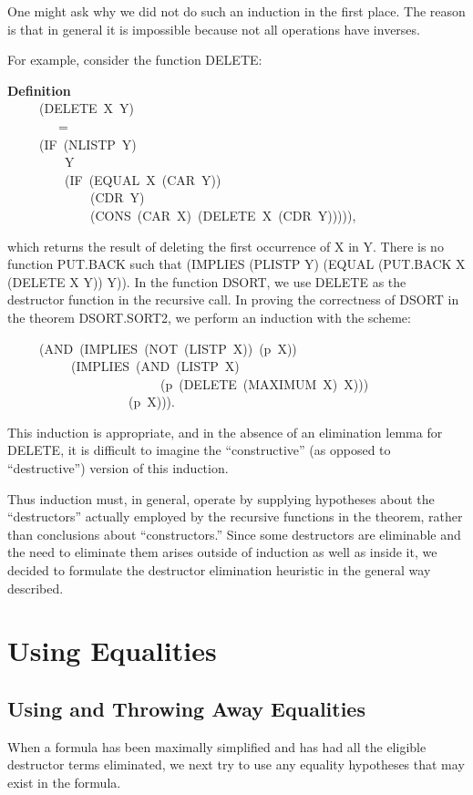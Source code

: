 \documentclass[10pt]{book}
\newenvironment{pubasis}{\begin{flushleft}}{\end{flushleft}}
\newcommand{\axiomordefinition}[1]{\vspace{6pt}\Large\textsf{\textbf{#1}}\normalsize}
\begin{document}
One might ask why we did not do such an induction in the first place.
The reason is that in general it is impossible because not all operations
have inverses.

For example, consider the function DELETE:
\begin{pubasis}
\axiomordefinition{Definition}\\
~~~~~(DELETE~X~Y)\\
~~~~~~~~=\\
~~~~~(IF~(NLISTP~Y)\\
~~~~~~~~~Y\\
~~~~~~~~~(IF~(EQUAL~X~(CAR~Y))\\
~~~~~~~~~~~~~(CDR~Y)\\
~~~~~~~~~~~~~(CONS~(CAR~X)~(DELETE~X~(CDR~Y))))),\\
\end{pubasis}
which returns the result of deleting the first occurrence
of X in Y.  There is no function PUT.BACK such that
(IMPLIES (PLISTP Y) (EQUAL (PUT.BACK X (DELETE X Y)) Y)).
In the function DSORT, we use DELETE as the destructor
function in the recursive call.  In proving the correctness of
DSORT in the theorem DSORT.SORT2, we perform an induction with
the scheme: 
\begin{pubasis}
~~~~~(AND~(IMPLIES~(NOT~(LISTP~X))~(p~X))\\
~~~~~~~~~~(IMPLIES~(AND~(LISTP~X)\\
~~~~~~~~~~~~~~~~~~~~~~~~(p~(DELETE~(MAXIMUM~X)~X)))\\
~~~~~~~~~~~~~~~~~~~(p~X))).\\
\end{pubasis}
This induction is appropriate, and in the
absence of an elimination lemma for DELETE, it is
difficult to imagine the ``constructive'' (as
opposed to ``destructive'') version of this induction.

Thus induction must, in general, operate by supplying hypotheses about
the ``destructors'' actually employed by the recursive functions in the theorem,
rather than conclusions about ``constructors.''  Since
some destructors are eliminable and the need to eliminate them arises
outside of induction as well as inside it, we decided to formulate the
destructor elimination heuristic in the general way described.	

\chapter{Using Equalities}
\pagestyle{headings}
\label{SECFERTILIZE}
\section{Using and Throwing Away Equalities}
When a formula has been maximally simplified and has had all the
eligible destructor terms eliminated, we next try to use any
equality hypotheses that may exist in the formula.
\end{document}
